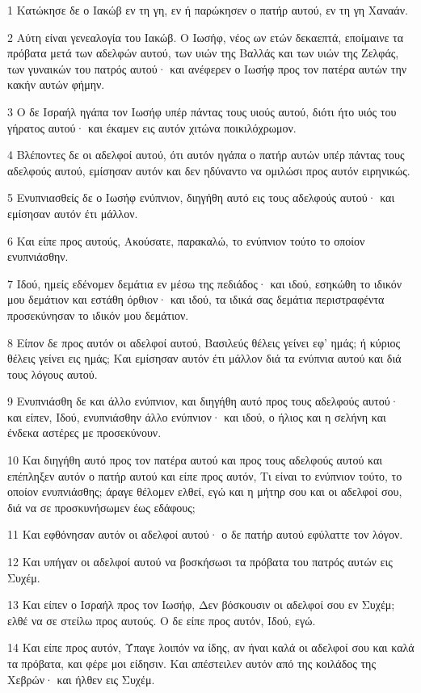 \par 1 Κατώκησε δε ο Ιακώβ εν τη γη, εν ή παρώκησεν ο πατήρ αυτού, εν τη γη Χαναάν.
\par 2 Αύτη είναι γενεαλογία του Ιακώβ. Ο Ιωσήφ, νέος ων ετών δεκαεπτά, εποίμαινε τα πρόβατα μετά των αδελφών αυτού, των υιών της Βαλλάς και των υιών της Ζελφάς, των γυναικών του πατρός αυτού· και ανέφερεν ο Ιωσήφ προς τον πατέρα αυτών την κακήν αυτών φήμην.
\par 3 Ο δε Ισραήλ ηγάπα τον Ιωσήφ υπέρ πάντας τους υιούς αυτού, διότι ήτο υιός του γήρατος αυτού· και έκαμεν εις αυτόν χιτώνα ποικιλόχρωμον.
\par 4 Βλέποντες δε οι αδελφοί αυτού, ότι αυτόν ηγάπα ο πατήρ αυτών υπέρ πάντας τους αδελφούς αυτού, εμίσησαν αυτόν και δεν ηδύναντο να ομιλώσι προς αυτόν ειρηνικώς.
\par 5 Ενυπνιασθείς δε ο Ιωσήφ ενύπνιον, διηγήθη αυτό εις τους αδελφούς αυτού· και εμίσησαν αυτόν έτι μάλλον.
\par 6 Και είπε προς αυτούς, Ακούσατε, παρακαλώ, το ενύπνιον τούτο το οποίον ενυπνιάσθην.
\par 7 Ιδού, ημείς εδένομεν δεμάτια εν μέσω της πεδιάδος· και ιδού, εσηκώθη το ιδικόν μου δεμάτιον και εστάθη όρθιον· και ιδού, τα ιδικά σας δεμάτια περιστραφέντα προσεκύνησαν το ιδικόν μου δεμάτιον.
\par 8 Είπον δε προς αυτόν οι αδελφοί αυτού, Βασιλεύς θέλεις γείνει εφ' ημάς; ή κύριος θέλεις γείνει εις ημάς; Και εμίσησαν αυτόν έτι μάλλον διά τα ενύπνια αυτού και διά τους λόγους αυτού.
\par 9 Ενυπνιάσθη δε και άλλο ενύπνιον, και διηγήθη αυτό προς τους αδελφούς αυτού· και είπεν, Ιδού, ενυπνιάσθην άλλο ενύπνιον· και ιδού, ο ήλιος και η σελήνη και ένδεκα αστέρες με προσεκύνουν.
\par 10 Και διηγήθη αυτό προς τον πατέρα αυτού και προς τους αδελφούς αυτού και επέπληξεν αυτόν ο πατήρ αυτού και είπε προς αυτόν, Τι είναι το ενύπνιον τούτο, το οποίον ενυπνιάσθης; άραγε θέλομεν ελθεί, εγώ και η μήτηρ σου και οι αδελφοί σου, διά να σε προσκυνήσωμεν έως εδάφους;
\par 11 Και εφθόνησαν αυτόν οι αδελφοί αυτού· ο δε πατήρ αυτού εφύλαττε τον λόγον.
\par 12 Και υπήγαν οι αδελφοί αυτού να βοσκήσωσι τα πρόβατα του πατρός αυτών εις Συχέμ.
\par 13 Και είπεν ο Ισραήλ προς τον Ιωσήφ, Δεν βόσκουσιν οι αδελφοί σου εν Συχέμ; ελθέ να σε στείλω προς αυτούς. Ο δε είπε προς αυτόν, Ιδού, εγώ.
\par 14 Και είπε προς αυτόν, Ύπαγε λοιπόν να ίδης, αν ήναι καλά οι αδελφοί σου και καλά τα πρόβατα, και φέρε μοι είδησιν. Και απέστειλεν αυτόν από της κοιλάδος της Χεβρών· και ήλθεν εις Συχέμ.
